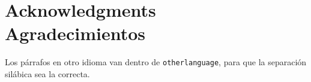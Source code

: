 \documentclass[../main]{subfiles}
\begin{document}
\chapter*{Acknowledgments\\\foreignlanguage{spanish}{Agradecimientos}}
\lipsum[1-4]

\begin{otherlanguage}{spanish}
Los párrafos en otro idioma van dentro de \verb|otherlanguage|, para que la separación silábica sea la correcta.
\lipsum[5]
\end{otherlanguage}
\end{document}
